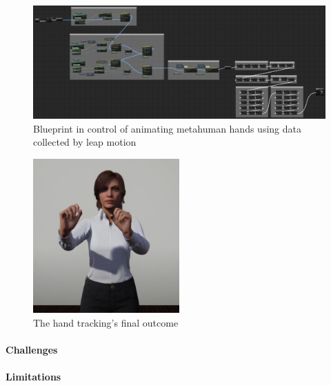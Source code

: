 \begin{figure}[!htb]
\includegraphics[width=\textwidth]{figures/BPHandsAndIK.png}
\centering
\caption{Blueprint in control of animating metahuman hands using data collected by leap motion}
\label{fig:BPHandsAndIK}
\end{figure}

\begin{figure}[!htb]
\includegraphics[width=0.5\textwidth]{figures/final.png}
\centering
\caption{The hand tracking's final outcome}
\label{fig:handTrack}
\end{figure}

\paragraph{Challenges}


\paragraph{Limitations}













